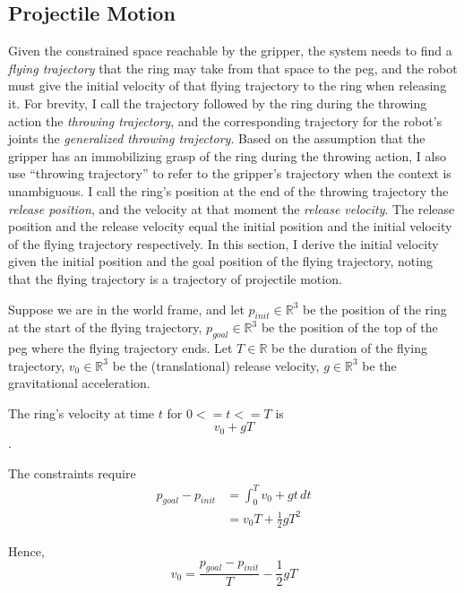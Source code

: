 \documentclass[conference]{IEEEtran}
\begin{document}
\subsection{Projectile Motion}
Given the constrained space reachable by the gripper, the system needs to find a \textit{flying trajectory} that the ring may take from that space to the peg, and the robot must give the initial velocity of that flying trajectory to the ring when releasing it. For brevity, I call the trajectory followed by the ring during the throwing action the \textit{throwing trajectory}, and the corresponding trajectory for the robot's joints the \textit{generalized throwing trajectory}. Based on the assumption that the gripper has an immobilizing grasp of the ring during the throwing action, I also use ``throwing trajectory'' to refer to the gripper's trajectory when the context is unambiguous. I call the ring's position at the end of the throwing trajectory the \textit{release position}, and the velocity at that moment the \textit{release velocity}. The release position and the release velocity equal the initial position and the initial velocity of the flying trajectory respectively. In this section, I derive the initial velocity given the initial position and the goal position of the flying trajectory, noting that the flying trajectory is a trajectory of projectile motion.

Suppose we are in the world frame, and let $p_{init} \in \mathbb{R}^3$ be the position of the ring at the start of the flying trajectory, $p_{goal} \in \mathbb{R}^3$ be the position of the top of the peg where the flying trajectory ends. Let $T \in \mathbb{R}$ be the duration of the flying trajectory, $v_0 \in \mathbb{R}^3$ be the (translational) release velocity, $g \in \mathbb{R}^3$ be the gravitational acceleration.

The ring's velocity at time $t$ for $0 <= t <= T$ is
\begin{equation*}
v_0 + gT
\end{equation*}.

The constraints require
\begin{align*}
p_{goal} - p_{init} &= \int_{0}^{T} v_0 + g t \,dt \\
&= v_0 T + \frac{1}{2} g T^2
\end{align*}

Hence,
\begin{equation*}
v_0 = \frac{p_{goal} - p_{init}}{T} - \frac{1}{2} g T
\end{equation*}
\end{document}
